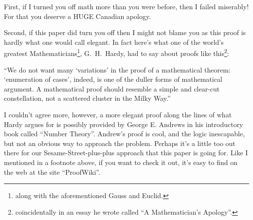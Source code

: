 \documentclass{article}
\newenvironment{jprIn}{\begin{adjustwidth}{2em}{}}{\end{adjustwidth}}
\begin{document}
First, if I turned you off math more than you were before,
then I failed miserably!  For that you deserve a HUGE Canadian apology.

Second, if this paper did turn you off
then I might not blame you as this proof is hardly what one would call elegant.
In fact here's what one of the
world's greatest Mathematicians\footnote{along with the aforementioned Gauss and Euclid.},
G.~H.~Hardy, had to say about
proofs like this\footnote{coincidentally in an essay he wrote called ``A Mathematician's Apology''.}:

\begin{jprIn}
``We do not want many `variations' in the proof of a mathematical
theorem: `enumeration of cases', indeed, is one
of the duller forms of mathematical argument. A mathematical proof
should resemble a simple and clear-cut constellation, not a scattered
cluster in the Milky Way.''
\end{jprIn}

I couldn't agree more, however, a more elegant proof along the lines
of what Hardy argues for is possibly provided by George E. Andrews in his
introductory book called ``Number Theory''. Andrew's proof is cool,
and the logic inescapable, but not an obvious way to approach the problem.
Perhaps it's a little too out there for our Sesame-Street-plus-plus
approach that this paper is going for. Like I mentioned in a footnote above,
if you want to check it out, it's easy to find on the web at the site ``ProofWiki''.
\end{document}
